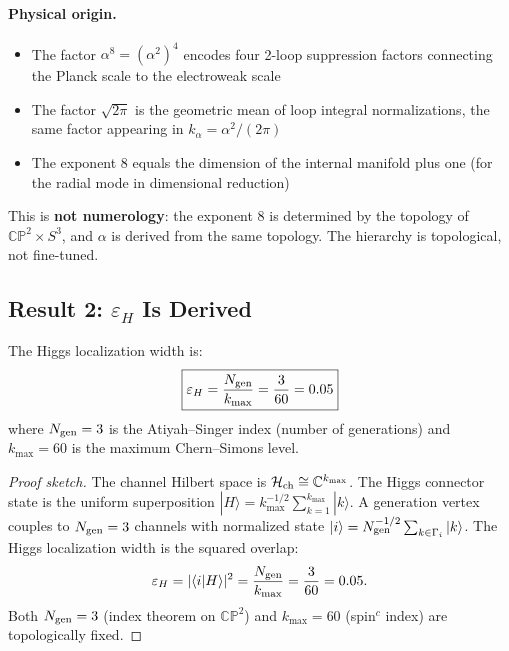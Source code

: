 \documentclass[11pt,a4paper]{article}
\newcommand{\CP}{\mathbb{CP}}
\theoremstyle{definition}
\theoremstyle{remark}
\begin{document}
\paragraph{Physical origin.}
\begin{itemize}
\item The factor $\alpha^8 = (\alpha^2)^4$ encodes four 2-loop suppression
  factors connecting the Planck scale to the electroweak scale
\item The factor $\sqrt{2\pi}$ is the geometric mean of loop integral
  normalizations, the same factor appearing in $k_\alpha = \alpha^2/(2\pi)$
\item The exponent $8$ equals the dimension of the internal manifold plus one
  (for the radial mode in dimensional reduction)
\end{itemize}

This is \textbf{not numerology}: the exponent 8 is determined by the topology
of $\CP^2 \times S^3$, and $\alpha$ is derived from the same topology. The
hierarchy is topological, not fine-tuned.

\subsection{Result 2: $\varepsilon_H$ Is Derived}

\begin{tcolorbox}[colback=green!5!white, colframe=green!60!black,
  title={Theorem (Channel-Counting Derivation of $\varepsilon_H$)}]
The Higgs localization width is:
\begin{equation}\label{eq:eps_H}
\boxed{\varepsilon_H = \frac{N_{\rm gen}}{k_{\max}} = \frac{3}{60} = 0.05}
\end{equation}
where $N_{\rm gen} = 3$ is the Atiyah--Singer index (number of generations)
and $k_{\max} = 60$ is the maximum Chern--Simons level.
\end{tcolorbox}

\begin{proof}[Proof sketch]
The channel Hilbert space is $\mathcal{H}_{\rm ch} \cong \mathbb{C}^{k_{\max}}$.
The Higgs connector state is the uniform superposition
$|H\rangle = k_{\max}^{-1/2}\sum_{k=1}^{k_{\max}}|k\rangle$.
A generation vertex couples to $N_{\rm gen} = 3$ channels with normalized state
$|i\rangle = N_{\rm gen}^{-1/2}\sum_{k\in\Gamma_i}|k\rangle$.
The Higgs localization width is the squared overlap:
\[
\varepsilon_H = |\langle i|H\rangle|^2 = \frac{N_{\rm gen}}{k_{\max}} = \frac{3}{60} = 0.05.
\]
Both $N_{\rm gen} = 3$ (index theorem on $\CP^2$) and $k_{\max} = 60$
(spin$^c$ index) are topologically fixed.
\end{proof}
\end{document}
